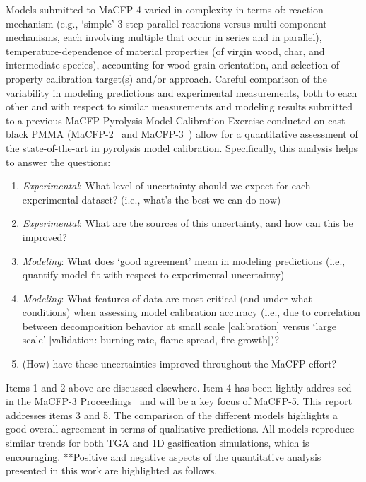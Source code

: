 \documentclass{article}
\begin{document}
Models submitted to MaCFP-4 varied in complexity in terms of: reaction mechanism (e.g., `simple' 3-step parallel reactions versus multi-component mechanisms, each involving multiple that occur in series and in parallel), temperature-dependence of material properties (of virgin wood, char, and intermediate species), accounting for wood grain orientation, and selection of property calibration target(s) and/or approach. Careful comparison of the variability in modeling predictions and experimental measurements, both to each other and with respect to similar measurements and modeling results submitted to a previous MaCFP Pyrolysis Model Calibration Exercise conducted on cast black PMMA (MaCFP-2~\cite{MaCFP2ExpSummary} and MaCFP-3~\cite{MaCFP3Proceedings}) allow for a quantitative assessment of the state-of-the-art in pyrolysis model calibration. Specifically, this analysis helps to answer the questions:
\begin{enumerate}[noitemsep]
	\item \textit{Experimental}: What level of uncertainty should we expect for each experimental dataset? (i.e., what’s the best we can do now) 
	\item \textit{Experimental}: What are the sources of this uncertainty, and how can this be improved?
	\item \textit{Modeling}: What does `good agreement' mean in modeling predictions (i.e., quantify model fit with respect to experimental uncertainty)
	\item \textit{Modeling}: What features of data are most critical (and under what conditions) when assessing model calibration accuracy (i.e., due to correlation between decomposition behavior at small scale [calibration] versus ‘large scale’ [validation: burning rate, flame spread, fire growth])?
	\item (How) have these uncertainties improved throughout the MaCFP effort?
\end{enumerate}
Items 1 and 2 above are discussed elsewhere. Item 4 has been lightly addres sed in the MaCFP-3 Proceedings~\cite{MaCFP3Proceedings} and will be a key focus of MaCFP-5. This report addresses items 3 and 5. The comparison of the different models highlights a good overall agreement in terms of qualitative predictions. All models reproduce similar trends for both TGA and 1D gasification simulations, which is encouraging. **Positive and negative aspects of the quantitative analysis presented in this work are highlighted as follows.
\end{document}
